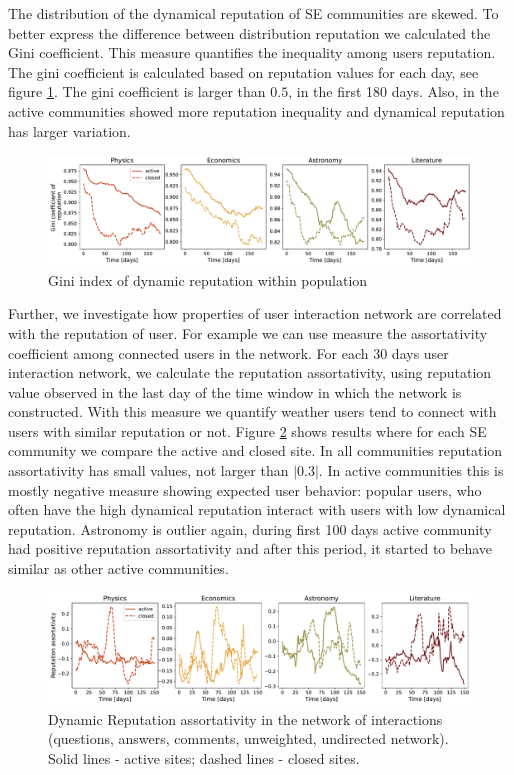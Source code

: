 The distribution of the dynamical reputation of SE communities are skewed. To better express the difference between distribution reputation we calculated the Gini coefficient. This measure quantifies the inequality among users reputation. The gini coefficient is calculated based on reputation values for each day, see figure \ref{fig:dynrep-gini}. The gini coefficient is larger than $0.5$, in the first 180 days. Also, in the active communities showed more reputation inequality and dynamical reputation has larger variation. 

\begin{figure}[h]
	\centering
	\includegraphics[width=1\linewidth]{figures/stackexchange/gini.pdf}
	\caption{Gini index of dynamic reputation within population}
	\label{fig:dynrep-gini}
\end{figure} 

Further, we investigate how properties of user interaction network are correlated with the reputation of user. For example we can use measure the assortativity coefficient among connected users in the network. For each 30 days user interaction network, we calculate the reputation assortativity, using reputation value observed in the last day of the time window in which the network is constructed. With this measure we quantify weather users tend to connect with users with similar reputation or not. Figure \ref{fig:dyn_rep_assort} shows results where for each SE community we compare the active and closed site. In all communities reputation assortativity has small values, not larger than $|0.3|$. In active communities this is mostly negative measure showing expected user behavior: popular users, who often have the high dynamical reputation interact with users with low dynamical reputation. Astronomy is outlier again, during first 100 days active community had positive reputation assortativity and after this period, it started to behave similar as other active communities. 

\begin{figure}[h]
	\centering
	\includegraphics[width=1\linewidth]{figures/stackexchange/reputation_assortativity.pdf}
	\caption{Dynamic Reputation assortativity in the network of interactions (questions, answers, comments, unweighted, undirected network). Solid lines - active sites; dashed lines - closed sites.}
	\label{fig:dyn_rep_assort}
\end{figure}

